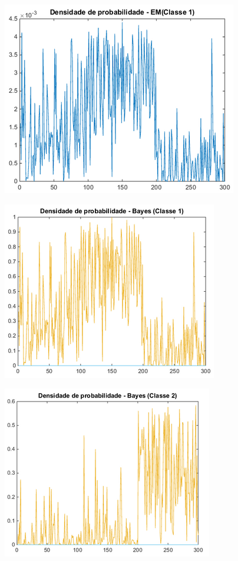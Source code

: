 \documentclass[12pt,twoside]{report}
\begin{document}
\begin{figure}[ht]
    \centering
    \includegraphics[scale=0.75]{pdf_em_c1}
    \caption{}
    \label{fig:pdf_em_c1}
\end{figure}

\begin{figure}[ht]
    \centering
    \includegraphics[scale=0.75]{bayes_c1}
    \caption{}
    \label{fig:bayes_c1}
\end{figure}

\begin{figure}[ht]
    \centering
    \includegraphics[scale=0.75]{bayes_c2}
    \caption{}
    \label{fig:bayes_c2}
\end{figure}
\end{document}
